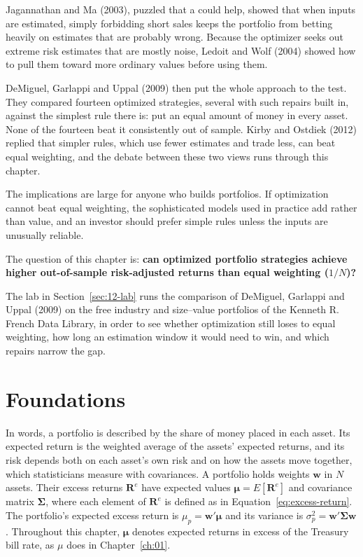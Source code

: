 Jagannathan and Ma (2003), puzzled that a  could help, showed that when inputs are estimated, simply forbidding short sales keeps the portfolio from betting heavily on estimates that are probably wrong. Because the optimizer seeks out extreme risk estimates that are mostly noise, Ledoit and Wolf (2004) showed how to pull them toward more ordinary values before using them. 

DeMiguel, Garlappi and Uppal (2009) then put the whole approach to the test. They compared fourteen optimized strategies, several with such repairs built in, against the simplest rule there is: put an equal amount of money in every asset. None of the fourteen beat it consistently out of sample. Kirby and Ostdiek (2012) replied that simpler rules, which use fewer estimates and trade less, can beat equal weighting, and the debate between these two views runs through this chapter.

The implications are large for anyone who builds portfolios. If optimization cannot beat equal weighting, the sophisticated models used in practice add  rather than value, and an investor should prefer simple rules unless the inputs are unusually reliable. 

The question of this chapter is: \textbf{can optimized portfolio strategies achieve higher out-of-sample risk-adjusted returns than equal weighting ($1/N$)?}

The lab in Section~\ref{sec:12-lab} runs the comparison of DeMiguel, Garlappi and Uppal (2009) on the free industry and size--value portfolios of the Kenneth R. French Data Library, in order to see whether optimization still loses to equal weighting, how long an estimation window it would need to win, and which repairs narrow the gap.


\section{Foundations}
\label{sec:12-foundations}

In words, a portfolio is described by the share of money placed in each asset. Its expected return is the weighted average of the assets' expected returns, and its risk depends both on each asset's own risk and on how the assets move together, which statisticians measure with covariances. A portfolio holds weights $\mathbf{w}$ in $N$ assets. Their excess returns $\mathbf{R}^{e}$ have expected values $\boldsymbol{\mu} = E[\mathbf{R}^{e}]$ and covariance matrix $\boldsymbol{\Sigma}$, where each element of $\mathbf{R}^{e}$ is defined as in Equation~\eqref{eq:excess-return}. The portfolio's expected excess return is $\mu_p = \mathbf{w}'\boldsymbol{\mu}$ and its variance is $\sigma_p^2 = \mathbf{w}'\boldsymbol{\Sigma}\mathbf{w}$. Throughout this chapter, $\boldsymbol{\mu}$ denotes expected returns in excess of the Treasury bill rate, as $\mu$ does in Chapter~\ref{ch:01}.

